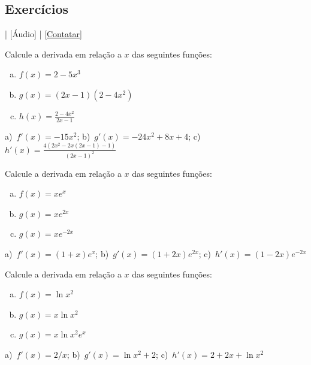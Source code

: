 \subsection*{Exercícios}

\begin{flushright}
  [Vídeo] | [Áudio] | \href{https://phkonzen.github.io/notas/contato.html}{[Contatar]}
\end{flushright}

\begin{exer}
  Calcule a derivada em relação a $x$ das seguintes funções:
  \begin{enumerate}[a)]
  \item $f(x) = 2 - 5x^3$ \\
  \item $g(x) = (2x-1)\left(2-4x^2\right)$
  \item $\displaystyle h(x) = \frac{2-4x^2}{2x-1}$
  \end{enumerate}
\end{exer}
\begin{resp}
  a)~$f'(x) = -15x^2$; b)~$g'(x)=- 24 x^{2} + 8 x + 4$; c)~$\displaystyle h'(x) = \frac{4 \left(2 x^{2} - 2 x \left(2 x - 1\right) - 1\right)}{\left(2 x - 1\right)^{2}}$
\end{resp}

\begin{exer}
  Calcule a derivada em relação a $x$ das seguintes funções:
  \begin{enumerate}[a)]
  \item $f(x) = xe^x$
  \item $g(x) = xe^{2x}$
  \item $g(x) = xe^{-2x}$
  \end{enumerate}
\end{exer}
\begin{resp}
  a)~$f'(x) = (1+x)e^x$; b)~$g'(x) = (1+2x)e^{2x}$; c)~$h'(x) = (1-2x)e^{-2x}$
\end{resp}

\begin{exer}
  Calcule a derivada em relação a $x$ das seguintes funções:
  \begin{enumerate}[a)]
  \item $f(x) = \ln x^2$
  \item $g(x) = x\ln x^2$
  \item $g(x) = x\ln x^2e^x$
  \end{enumerate}
\end{exer}
\begin{resp}
  a)~$f'(x) = 2/x$; b)~$g'(x) = \ln x^2 + 2$; c)~$h'(x) = 2+2x+\ln x^2$
\end{resp}

